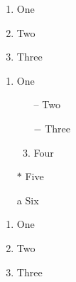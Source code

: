 \documentclass{article}
\begin{document}
\begin{enumerate}
\item One
\item Two
\item Three
\end{enumerate}

\begin{enumerate}
\item One
\begin{enumerate}
\item[--] Two
\item[$-$] Three
\item Four
\end{enumerate}
\item[$\ast$] Five
\item[a] Six
\end{enumerate}

\begin{enumerate}[label=(\roman*)]
\item One
\item Two
\item Three
\end{enumerate}
\end{document}
